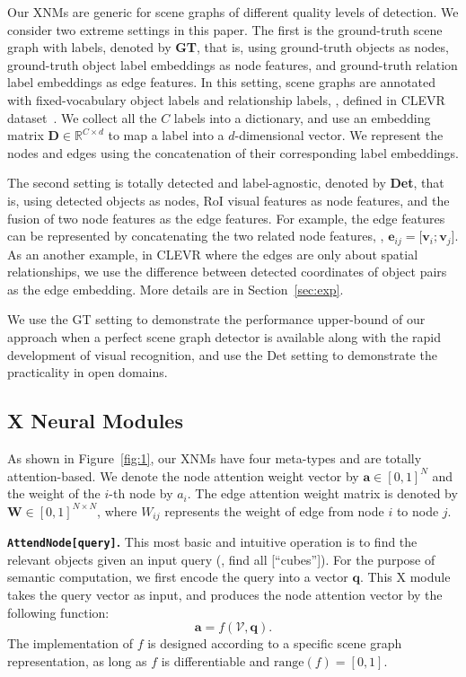 \documentclass[10pt,twocolumn,letterpaper]{article}
\begin{document}
Our XNMs are generic for scene graphs of different quality levels of detection.
We consider two extreme settings in this paper.
The first is the ground-truth scene graph with labels, denoted by \textbf{GT}, that is, using ground-truth objects as nodes, ground-truth object label embeddings as node features, and ground-truth relation label embeddings as edge features.
In this setting, scene graphs are annotated with fixed-vocabulary object labels and relationship labels, \eg, defined in CLEVR dataset~\cite{johnson2017clevr}.
We collect all the $C$ labels into a dictionary, and use an embedding matrix $\mathbf{D} \in \mathbb{R}^{C \times d}$ to map a label into a $d$-dimensional vector.
We represent the nodes and edges using the concatenation of their corresponding label embeddings.


The second setting is totally detected and label-agnostic, denoted by \textbf{Det}, that is, using detected objects as nodes, RoI visual features as node features, and the fusion of two node features as the edge features.
For example, the edge features can be represented by concatenating the two related node features, \ie, $\mathbf{e}_{ij} = \big[ \mathbf{v}_i; \mathbf{v}_j \big]$. As an another example, in CLEVR where the edges are only about spatial relationships, we use the difference between detected coordinates of object pairs as the edge embedding. More details are in Section~\ref{sec:exp}.

We use the GT setting to demonstrate the performance upper-bound of our approach when a perfect scene graph detector is available along with the rapid development of visual recognition, and use the Det setting to demonstrate the practicality in open domains.


\subsection{X Neural Modules}
As shown in Figure~\ref{fig:1}, our XNMs have four meta-types and are totally attention-based. 
We denote the node attention weight vector by $\mathbf{a} \in [0,1]^{N}$ and the weight of the $i$-th node by $a_i$.
The edge attention weight matrix is denoted by $\mathbf{W} \in [0,1]^{N \times N}$, where $W_{ij}$ represents the weight of edge from node $i$ to node $j$.

\textbf{\texttt{AttendNode[query]}.}
This most basic and intuitive operation is to find the relevant objects given an input query (\eg, find all [``cubes'']).
For the purpose of semantic computation, we first encode the query into a vector $\mathbf{q}$.
This X module takes the query vector as input, and produces the node attention vector by the following function:
\begin{equation}\label{eq:1}
    \mathbf{a} = f(\mathcal{V}, \mathbf{q}).
\end{equation}
The implementation of $f$ is designed according to a specific scene graph representation, as long as $f$ is differentiable and $\mathrm{range}(f)=[0,1]$.
\end{document}
